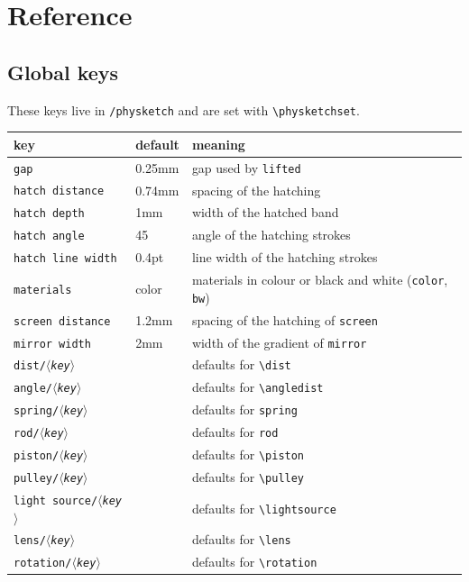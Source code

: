 \documentclass[a4paper,11pt]{article}
\newcommand\cs[1]{\texttt{\textbackslash#1}}
\newcommand\key[1]{\texttt{#1}}
\newcommand\meta[1]{\ensuremath{\langle}\textit{#1}\ensuremath{\rangle}}
\begin{document}
\section{Reference}\label{sec:keys}
\subsection{Global keys}
These keys live in \texttt{/physketch} and are set with \cs{physketchset}.
\begin{center}
\begin{tabular}{lll}
  \toprule
  key & default & meaning \\
  \midrule
  \key{gap} & 0.25mm & gap used by \key{lifted} \\
  \key{hatch distance} & 0.74mm & spacing of the hatching \\
  \key{hatch depth} & 1mm & width of the hatched band \\
  \key{hatch angle} & 45 & angle of the hatching strokes \\
  \key{hatch line width} & 0.4pt & line width of the hatching strokes \\
  \key{materials} & color & materials in colour or black and white (\texttt{color}, \texttt{bw}) \\
  \key{screen distance} & 1.2mm & spacing of the hatching of \key{screen} \\
  \key{mirror width} & 2mm & width of the gradient of \key{mirror} \\
  \key{dist/\meta{key}} & & defaults for \cs{dist} \\
  \key{angle/\meta{key}} & & defaults for \cs{angledist} \\
  \key{spring/\meta{key}} & & defaults for \key{spring} \\
  \key{rod/\meta{key}} & & defaults for \key{rod} \\
  \key{piston/\meta{key}} & & defaults for \cs{piston} \\
  \key{pulley/\meta{key}} & & defaults for \cs{pulley} \\
  \key{light source/\meta{key}} & & defaults for \cs{lightsource} \\
  \key{lens/\meta{key}} & & defaults for \cs{lens} \\
  \key{rotation/\meta{key}} & & defaults for \cs{rotation} \\
  \bottomrule
\end{tabular}
\end{center}
\end{document}
